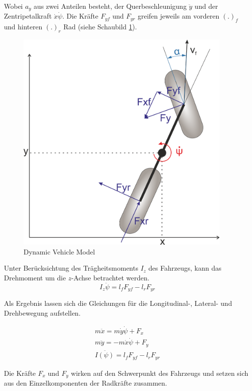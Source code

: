 \documentclass{like}
\begin{document}
Wobei \(a_y\) aus zwei Anteilen besteht, der Querbeschleunigung \(\ddot{y}\) und der Zentripetalkraft \(\dot{x} \dot{\psi}\).  
Die Kräfte \(F_{yf}\) und \(F_{yr}\) greifen jeweils am vorderen \((.)_f\) und hinteren \((.)_r\) Rad (siehe Schaubild \ref{fig:dynModel}). 

\begin{figure}[hb!]
	\centering
	\includegraphics[width=300pt]{Abbildungen/dynBicycle.png}
	\caption{Dynamic Vehicle Model}
	\label{fig:dynModel}
\end{figure}




Unter Berücksichtung des Trägheitsmoments \(I_z\) des Fahrzeugs, kann das Drehmoment um die \(z\)-Achse betrachtet werden.
\begin{equation}
I_z \ddot{\psi} = l_f F_{yf} - l_r F_{yr}
\end{equation}

Als Ergebnis lassen sich die Gleichungen für die Longitudinal-, Lateral- und Drehbewegung aufstellen.

\begin{eqnarray}
m \ddot{x} = m \dot{y} \dot{\psi} + F_x \\
m \ddot{y} = - m \dot{x} \dot{\psi} + F_y \\
I \ddot{(\psi)} = l_f F_{yf} - l_r F_{yr}
\end{eqnarray}

Die Kräfte \(F_{x}\) und \(F_{y}\) wirken auf den Schwerpunkt des Fahrzeugs und setzen sich aus den Einzelkomponenten der Radkräfte zusammen.
\end{document}
